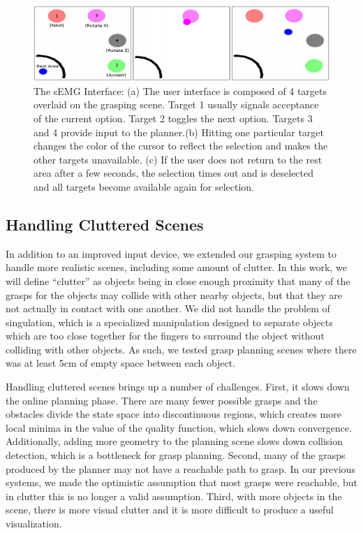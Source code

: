 \begin{figure}
\centering
\includegraphics[width=.99\textwidth]{semg_interface_blank.png}
\caption{The sEMG Interface: (a) The user interface is composed of 4 targets overlaid on the grasping scene. Target 1 usually signals acceptance of the current option. Target 2 toggles the next option. Targets 3 and 4 provide input to the planner.(b) Hitting one particular target changes the color of the cursor to reflect the selection and makes the other targets unavailable. (c) If the user does not return to the rest area after a few seconds, the selection times out and is deselected and all targets become available again for selection. }
\label{fig:semg_ui_blank}
\end{figure}


\subsection{Handling Cluttered Scenes}
In addition to an improved input device, we extended our grasping system to handle more realistic scenes, including some amount of clutter. In this work, we will define ``clutter'' as objects being in close enough proximity that many of the grasps for the objects may collide with other nearby objects, but that they are not actually in contact with one another. We did not handle the problem of singulation, which is a specialized manipulation designed to separate objects which are too close together for the fingers to surround the object without colliding with other objects. As such, we tested grasp planning scenes where there was at least 5cm of empty space between each object. 

Handling cluttered scenes brings up a number of challenges. First, it slows down the online planning phase. There are many fewer possible grasps and the obstacles divide the state space into discontinuous regions, which creates more local minima in the value of the quality function, which slows down convergence. Additionally, adding more geometry to the planning scene slows down collision detection, which is a bottleneck for grasp planning. Second, many of the grasps produced by the planner may not have a reachable path to grasp. In our previous systems, we made the optimistic assumption that most grasps were reachable, but in clutter this is no longer a valid assumption. Third, with more objects in the scene, there is more visual clutter and it is more difficult to produce a useful visualization.

